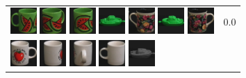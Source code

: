 \begin{figure}[tbp]
\begin{center}
\begin{tabular}{m{11cm} | m{3cm} |}
\includegraphics[width=1cm]{coil/beeld-31.eps}
\includegraphics[width=1cm]{coil/beeld-33.eps}
\includegraphics[width=1cm]{coil/beeld-32.eps}
\includegraphics[width=1cm]{coil/beeld-55.eps}
\includegraphics[width=1cm]{coil/beeld-61.eps}
\includegraphics[width=1cm]{coil/beeld-54.eps}
\includegraphics[width=1cm]{coil/beeld-60.eps}
& {\scriptsize 0.0}
\\
\includegraphics[width=1cm]{coil/beeld-36.eps}
\includegraphics[width=1cm]{coil/beeld-38.eps}
\includegraphics[width=1cm]{coil/beeld-41.eps}
\includegraphics[width=1cm]{coil/beeld-37.eps}
\includegraphics[width=1cm]{coil/beeld-27.eps}

\end{tabular}
\end{center}
\end{figure}
